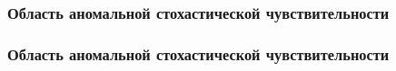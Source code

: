\documentclass[slidestop,compress,mathserif]{beamer}
\begin{document}
\begin{frame}
\frametitle{Область аномальной стохастической чувствительности}
\begin{figure}[h!]
\vspace{-1em}
\vspace{-2em}
\end{figure}
\end{frame}
\begin{frame}
\frametitle{Область аномальной стохастической чувствительности}
\begin{figure}[h!]
\vspace{-1em}
\vspace{-2em}
\end{figure}
\end{frame}
\end{document}
